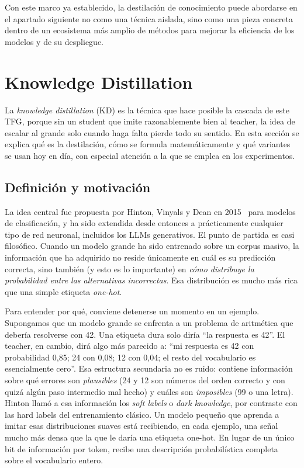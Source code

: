 Con este marco ya establecido, la destilación de conocimiento puede abordarse en el apartado siguiente no como una técnica aislada, sino como una pieza concreta dentro de un ecosistema más amplio de métodos para mejorar la eficiencia de los modelos y de su despliegue.

\section{Knowledge Distillation}
\label{sec:knowledge-distillation}

La \textit{knowledge distillation} (KD) es la técnica que hace posible la cascada de este TFG, porque sin un student que imite razonablemente bien al teacher, la idea de escalar al grande solo cuando haga falta pierde todo su sentido. En esta sección se explica qué es la destilación, cómo se formula matemáticamente y qué variantes se usan hoy en día, con especial atención a la que se emplea en los experimentos.

\subsection{Definición y motivación}

La idea central fue propuesta por Hinton, Vinyals y Dean en 2015~\cite{hinton2015distilling} para modelos de clasificación, y ha sido extendida desde entonces a prácticamente cualquier tipo de red neuronal, incluidos los LLMs generativos. El punto de partida es casi filosófico. Cuando un modelo grande ha sido entrenado sobre un corpus masivo, la información que ha adquirido no reside únicamente en cuál es su predicción correcta, sino también (y esto es lo importante) en \emph{cómo distribuye la probabilidad entre las alternativas incorrectas}. Esa distribución es mucho más rica que una simple etiqueta \emph{one-hot}.

Para entender por qué, conviene detenerse un momento en un ejemplo. Supongamos que un modelo grande se enfrenta a un problema de aritmética que debería resolverse con 42. Una etiqueta dura solo diría ``la respuesta es 42''. El teacher, en cambio, dirá algo más parecido a: ``mi respuesta es 42 con probabilidad 0,85; 24 con 0,08; 12 con 0,04; el resto del vocabulario es esencialmente cero''. Esa estructura secundaria no es ruido: contiene información sobre qué errores son \emph{plausibles} (24 y 12 son números del orden correcto y con quizá algún paso intermedio mal hecho) y cuáles son \emph{imposibles} (99 o una letra). Hinton llamó a esa información los \textit{soft labels} o \textit{dark knowledge}, por contraste con las hard labels del entrenamiento clásico. Un modelo pequeño que aprenda a imitar esas distribuciones suaves está recibiendo, en cada ejemplo, una señal mucho más densa que la que le daría una etiqueta one-hot. En lugar de un único bit de información por token, recibe una descripción probabilística completa sobre el vocabulario entero.

